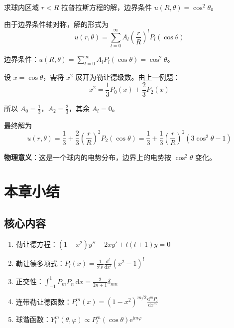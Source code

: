 \begin{lizi}{}{}
求球内区域 $r < R$ 拉普拉斯方程的解，边界条件 $u(R, \theta) = \cos^2\theta$。

\begin{jie}
    由于边界条件轴对称，解的形式为
    \begin{equation}
        u(r, \theta) = \sum_{l=0}^{\infty} A_l \left(\frac{r}{R}\right)^l P_l(\cos\theta)
    \end{equation}
    
    边界条件：$u(R, \theta) = \sum_{l=0}^{\infty} A_l P_l(\cos\theta) = \cos^2\theta$。
    
    设 $x = \cos\theta$，需将 $x^2$ 展开为勒让德级数。由上一例题：
    \begin{equation}
        x^2 = \frac{1}{3}P_0(x) + \frac{2}{3}P_2(x)
    \end{equation}
    
    所以 $A_0 = \frac{1}{3}$，$A_2 = \frac{2}{3}$，其余 $A_l = 0$。
    
    最终解为
    \begin{equation}
        \boxed{u(r, \theta) = \frac{1}{3} + \frac{2}{3}\left(\frac{r}{R}\right)^2 P_2(\cos\theta) = \frac{1}{3} + \frac{1}{3}\left(\frac{r}{R}\right)^2 (3\cos^2\theta - 1)}
    \end{equation}
    
    \textbf{物理意义}：这是一个球内的电势分布，边界上的电势按 $\cos^2\theta$ 变化。
\end{jie}
\end{lizi}

\section{本章小结}

\subsection{核心内容}

\begin{enumerate}
    \item 勒让德方程：$(1-x^2)y'' - 2xy' + l(l+1)y = 0$
    \item 勒让德多项式：$P_l(x) = \frac{1}{2^l l!}\frac{\mathrm{d}^l}{\mathrm{d}x^l}(x^2-1)^l$
    \item 正交性：$\int_{-1}^{1} P_mP_n\,\mathrm{d}x = \frac{2}{2n+1}\delta_{mn}$
    \item 连带勒让德函数：$P_l^m(x) = (1-x^2)^{m/2}\frac{\mathrm{d}^m P_l}{\mathrm{d}x^m}$
    \item 球谐函数：$Y_l^m(\theta, \varphi) \propto P_l^m(\cos\theta)\mathrm{e}^{\mathrm{i}m\varphi}$
\end{enumerate}

